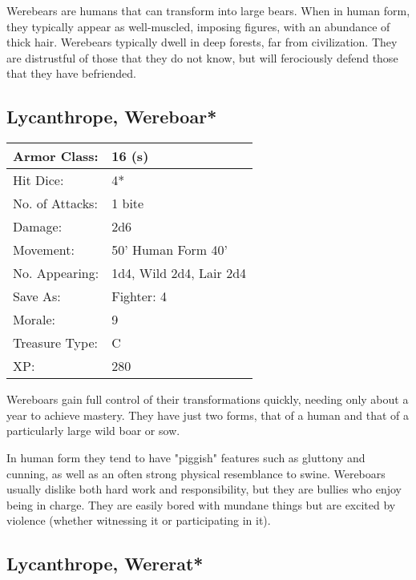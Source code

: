 \documentclass[a4paper,twoside,openany,10pt]{book}
\begin{document}
\begin{multicols}{2}
Werebears are humans that can transform into large bears. When in human form, they typically appear as well-muscled, imposing figures, with an abundance of thick hair. Werebears typically dwell in deep forests, far from civilization. They are distrustful of those that they do not know, but will ferociously defend those that they have befriended.

\subsection*{Lycanthrope, Wereboar*}\label{lycanthrope-wereboar}

\begin{tabularx}{0.50\textwidth}{@{}lX@{}}
Armor Class: & 16 (s) \\\hline
Hit Dice: & 4* \\\hline
No. of Attacks: & 1 bite \\\hline
Damage: & 2d6 \\\hline
Movement: & 50' Human Form 40' \\\hline
No. Appearing: & 1d4, Wild 2d4, Lair 2d4 \\\hline
Save As: & Fighter: 4 \\\hline
Morale: & 9 \\\hline
Treasure Type: & C \\\hline
XP: & 280 \\\hline
\end{tabularx}\medskip

Wereboars gain full control of their transformations quickly, needing only about a year to achieve mastery. They have just two forms, that of a human and that of a particularly large wild boar or sow. 

In human form they tend to have "piggish" features such as gluttony and cunning, as well as an often strong physical resemblance to swine. Wereboars usually dislike both hard work and responsibility, but they are bullies who enjoy being in charge. They are easily bored with mundane things but are excited by violence (whether witnessing it or participating in it).

\subsection*{Lycanthrope, Wererat*}\label{lycanthrope-wererat}


\end{multicols}
\end{document}
